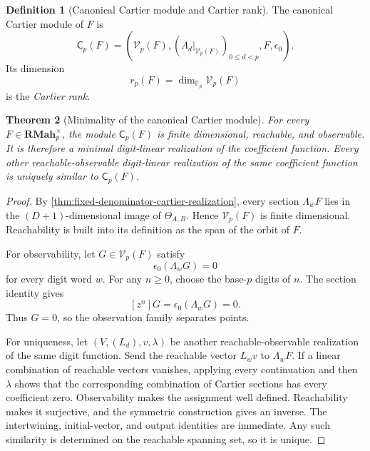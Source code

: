 \documentclass[11pt]{article}
\newtheorem{theorem}{Theorem}[section]
\theoremstyle{definition}
\newtheorem{definition}[theorem]{Definition}
\theoremstyle{remark}
\newcommand{\RMah}{\mathbf{RMah}}
\begin{document}
\begin{definition}[Canonical Cartier module and Cartier rank]
The canonical Cartier module of \(F\) is
\begin{equation}
\label{eq:block04-cartier-module}
\mathsf C_p(F)
=
\left(
\mathcal V_p(F),
(\Lambda_d|_{\mathcal V_p(F)})_{0\leq d<p},
F,
\epsilon_0
\right).
\end{equation}
Its dimension
\begin{equation}
\label{eq:block04-cartier-rank}
r_p(F)=\dim_{\mathbb F_p}\mathcal V_p(F)
\end{equation}
is the \emph{Cartier rank}.
\end{definition}

\begin{theorem}[Minimality of the canonical Cartier module]
\label{thm:canonical-cartier-minimality}
For every \(F\in\RMah_p^{\times}\), the module \(\mathsf C_p(F)\) is finite dimensional, reachable, and observable.  It is therefore a minimal digit-linear realization of the coefficient function.  Every other reachable-observable digit-linear realization of the same coefficient function is uniquely similar to \(\mathsf C_p(F)\).
\end{theorem}

\begin{proof}
By \cref{thm:fixed-denominator-cartier-realization}, every section \(\Lambda_wF\) lies in the \((D+1)\)-dimensional image of \(\Theta_{A,B}\).  Hence \(\mathcal V_p(F)\) is finite dimensional.  Reachability is built into its definition as the span of the orbit of \(F\).

For observability, let \(G\in\mathcal V_p(F)\) satisfy
\[
\epsilon_0(\Lambda_wG)=0
\]
for every digit word \(w\).  For any \(n\geq0\), choose the base-\(p\) digits of \(n\).  The section identity gives
\[
[z^n]G=\epsilon_0(\Lambda_wG)=0.
\]
Thus \(G=0\), so the observation family separates points.

For uniqueness, let \((V,(L_d),v,\lambda)\) be another reachable-observable realization of the same digit function.  Send the reachable vector \(L_wv\) to \(\Lambda_wF\).  If a linear combination of reachable vectors vanishes, applying every continuation and then \(\lambda\) shows that the corresponding combination of Cartier sections has every coefficient zero.  Observability makes the assignment well defined.  Reachability makes it surjective, and the symmetric construction gives an inverse.  The intertwining, initial-vector, and output identities are immediate.  Any such similarity is determined on the reachable spanning set, so it is unique.
\end{proof}
\end{document}

